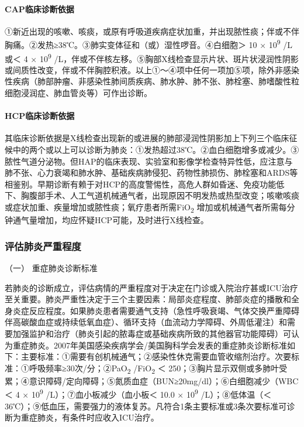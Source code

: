 \paragraph{CAP临床诊断依据}

①新近出现的咳嗽、咳痰，或原有呼吸道疾病症状加重，并出现脓性痰；伴或不伴胸痛。②发热≥38℃。③肺实变体征和（或）湿性啰音。④白细胞＞
10 × 10\textsuperscript{9} /L或＜ 4 × 10\textsuperscript{9}
/L，伴或不伴核左移。⑤胸部X线检查显示片状、斑片状浸润性阴影或间质性改变，伴或不伴胸腔积液。以上①～④项中任何一项加⑤项，除外非感染性疾病（肺部肿瘤、非感染性肺间质疾病、肺水肿、肺不张、肺栓塞、肺嗜酸性粒细胞浸润症、肺血管炎等）可作出诊断。

\paragraph{HCP临床诊断依据}

其临床诊断依据是X线检查出现新的或进展的肺部浸润性阴影加上下列三个临床征候中的两个或以上可以诊断为肺炎：①发热超过38℃。②血白细胞增多或减少。③脓性气道分泌物。但HAP的临床表现、实验室和影像学检查特异性低，应注意与肺不张、心力衰竭和肺水肿、基础疾病肺侵犯、药物性肺损伤、肺栓塞和ARDS等相鉴别。早期诊断有赖于对HCP的高度警惕性，高危人群如昏迷、免疫功能低下、胸腹部手术、人工气道机械通气者，出现原因不明发热或热型改变；咳嗽咳痰或症状加重、疾量增加或脓性痰；氧疗患者所需FiO\textsubscript{2}
增加或机械通气者所需每分钟通气量增加，均应怀疑HCP可能，及时进行X线检查。

\subsubsection{评估肺炎严重程度}

\hypertarget{text00272.htmlux5cux23CHP9-5-2-2-1}{}
（一） 重症肺炎诊断标准

若肺炎的诊断成立，评估病情的严重程度对于决定在门诊或入院治疗甚或ICU治疗至关重要。肺炎严重性决定于三个主要因素：局部炎症程度、肺部炎症的播散和全身炎症反应程度。如果肺炎患者需要通气支持（急性呼吸衰竭、气体交换严重障碍伴高碳酸血症或持续低氧血症）、循环支持（血流动力学障碍、外周低灌注）和需要加强监护和治疗（肺炎引起的脓毒症或基础疾病所致的其他器官功能障碍）可认为重症肺炎。2007年美国感染疾病学会/美国胸科学会发表的重症肺炎诊断标准如下：主要标准：①需要有创机械通气；②感染性休克需要血管收缩剂治疗。次要标准：①呼吸频率≥30次/分；②PaO\textsubscript{2}
/FiO\textsubscript{2} ＜
250；③胸片显示双侧或多肺叶受累；④意识障碍/定向障碍；⑤氮质血症（BUN≥20mg/dl）；⑥白细胞减少（WBC
＜ 4 × 10\textsuperscript{9} /L）；⑦血小板减少（血小板＜ 10.0 ×
10\textsuperscript{9} /L）；⑧低体温（＜
36℃）；⑨低血压，需要强力的液体复苏。凡符合1条主要标准或3条次要标准可诊断为重症肺炎，有条件时应收入ICU治疗。

